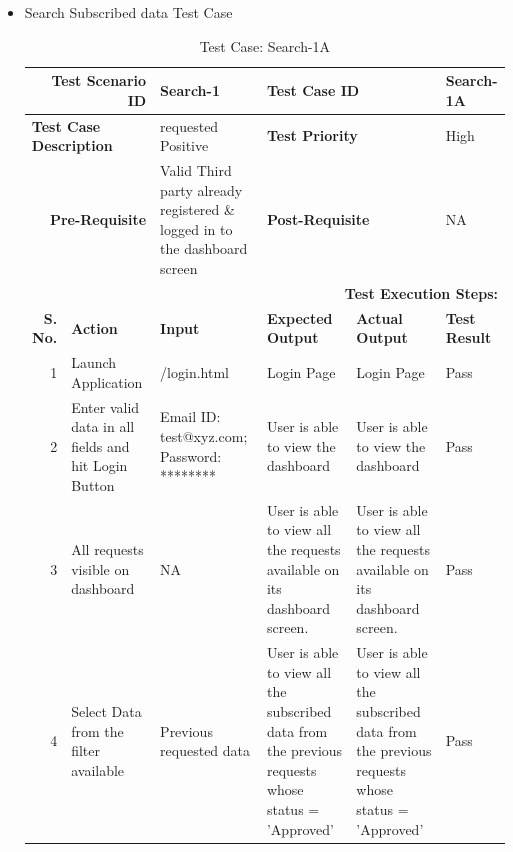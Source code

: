 \documentclass[a4paper, hidelinks, 12pt]{report}
\begin{document}
\begin{itemize}
\begin{table}[H]
\begin{tabular}{|r|p{4.355em}|p{7.715em}|p{6.43em}|p{5.855em}|p{5.07em}|}
    \bottomrule
    \end{tabular}%
  \label{tab:Test Case: Manage Request-3B}%
\end{table}%
\item{Search Subscribed data Test Case}
\begin{table}[H]
  \centering
  \caption{Test Case: Search-1A}
    \begin{tabular}{|r|p{4.355em}|p{7.715em}|p{6.43em}|p{5.855em}|p{5.07em}|}
    \toprule
    \multicolumn{2}{|p{13.425em}|}{\textbf{Test Scenario ID}} & Search-1 & \multicolumn{2}{p{12.285em}|}{\textbf{Test Case ID}} & Search-1A \\
    \midrule
    \multicolumn{2}{|l|}{\multirow{2}[2]{*}{\textbf{Test Case Description}}} & \multirow{2}[2]{*}{requested Positive} & \multicolumn{2}{l|}{\multirow{2}[2]{*}{\textbf{Test Priority}}} & \multirow{2}[2]{*}{High} \\
    \multicolumn{2}{|l|}{} & \multicolumn{1}{l|}{} & \multicolumn{2}{l|}{} & \multicolumn{1}{l|}{} \\
    \midrule
    \multicolumn{2}{|p{13.425em}|}{\textbf{Pre-Requisite}} & Valid Third party already registered \& logged in to the dashboard screen & \multicolumn{2}{p{12.285em}|}{\textbf{Post-Requisite}} & NA \\
    \midrule
    \multicolumn{6}{p{38.495em}|}{\textbf{Test Execution Steps:}} \\
    \midrule
    \multicolumn{1}{|p{5.07em}|}{\textbf{S. No.}} & \textbf{Action } & \textbf{Input} & \textbf{Expected Output} & \textbf{Actual Output} & \textbf{Test Result} \\
    \midrule
    1     & Launch Application & /login.html & Login Page & Login Page & Pass \\
    \midrule
    2     & Enter valid data in all fields and hit Login Button & Email ID: test@xyz.com; Password: ******** & User is able to view the dashboard & User is able to view the dashboard & Pass \\
    \midrule
    3     & All requests visible on dashboard & NA    & User is able to view all the requests available on its dashboard screen. & User is able to view all the requests available on its dashboard screen. & Pass \\
    \midrule
    4     & Select Data from the filter available & Previous requested data & User is able to view all the subscribed data from the previous requests whose status = 'Approved' & User is able to view all the subscribed data from the previous requests whose status = 'Approved' & Pass \\
    \bottomrule
    \end{tabular}%
  \label{tab:Test Case: Search-1A}%
\end{table}%


\end{itemize}
\end{document}
